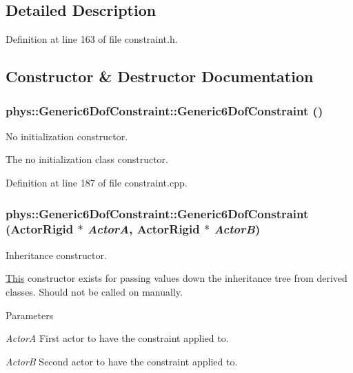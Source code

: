 \subsection{Detailed Description}


Definition at line 163 of file constraint.h.



\subsection{Constructor \& Destructor Documentation}
\hypertarget{classphys_1_1Generic6DofConstraint_ab897b1d7f04073cae60cf1d2615d04b4}{
\subsubsection[{Generic6DofConstraint}]{\setlength{\rightskip}{0pt plus 5cm}phys::Generic6DofConstraint::Generic6DofConstraint ()}}
\label{de/d2a/classphys_1_1Generic6DofConstraint_ab897b1d7f04073cae60cf1d2615d04b4}


No initialization constructor. 

The no initialization class constructor. 

Definition at line 187 of file constraint.cpp.

\hypertarget{classphys_1_1Generic6DofConstraint_aae8cea56ac1d384d326a089e48842cbc}{
\subsubsection[{Generic6DofConstraint}]{\setlength{\rightskip}{0pt plus 5cm}phys::Generic6DofConstraint::Generic6DofConstraint ({\bf ActorRigid} $\ast$ {\em ActorA}, \/  {\bf ActorRigid} $\ast$ {\em ActorB})}}
\label{de/d2a/classphys_1_1Generic6DofConstraint_aae8cea56ac1d384d326a089e48842cbc}


Inheritance constructor. 

\hyperlink{structThis}{This} constructor exists for passing values down the inheritance tree from derived classes. Should not be called on manually. 
\begin{DoxyParams}{Parameters}
\item[{\em ActorA}]First actor to have the constraint applied to. \item[{\em ActorB}]Second actor to have the constraint applied to. \end{DoxyParams}


